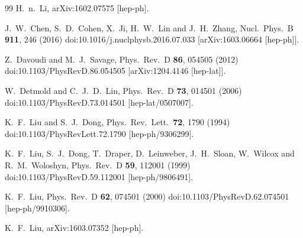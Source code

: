 \begin{thebibliography}{99}
  H.~n.~Li,
  arXiv:1602.07575 [hep-ph].

  J.~W.~Chen, S.~D.~Cohen, X.~Ji, H.~W.~Lin and J.~H.~Zhang,
  Nucl.\ Phys.\ B {\bf 911}, 246 (2016)
  doi:10.1016/j.nuclphysb.2016.07.033
  [arXiv:1603.06664 [hep-ph]].


  Z.~Davoudi and M.~J.~Savage,
  Phys.\ Rev.\ D {\bf 86}, 054505 (2012)
  doi:10.1103/PhysRevD.86.054505
  [arXiv:1204.4146 [hep-lat]].

  W.~Detmold and C.~J.~D.~Lin,
  Phys.\ Rev.\ D {\bf 73}, 014501 (2006)
  doi:10.1103/PhysRevD.73.014501
  [hep-lat/0507007].

  K.~F.~Liu and S.~J.~Dong,
  Phys.\ Rev.\ Lett.\  {\bf 72}, 1790 (1994)
  doi:10.1103/PhysRevLett.72.1790
  [hep-ph/9306299].

  K.~F.~Liu, S.~J.~Dong, T.~Draper, D.~Leinweber, J.~H.~Sloan, W.~Wilcox and R.~M.~Woloshyn,
  Phys.\ Rev.\ D {\bf 59}, 112001 (1999)
  doi:10.1103/PhysRevD.59.112001
  [hep-ph/9806491].

  K.~F.~Liu,
  Phys.\ Rev.\ D {\bf 62}, 074501 (2000)
  doi:10.1103/PhysRevD.62.074501
  [hep-ph/9910306].

  K.~F.~Liu,
  arXiv:1603.07352 [hep-ph].


\end{thebibliography}
